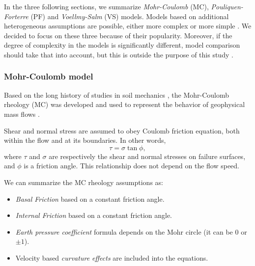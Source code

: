 \documentclass{article}
\begin{document}
In the three following sections, we summarize \emph{Mohr-Coulomb} (MC), \emph{Pouliquen-Forterre} (PF) and \emph{Voellmy-Salm} (VS) models. Models based on additional heterogeneous assumptions are possible, either more complex \citep{PitmanLe2005,Iverson2014} or more simple \citep{DadeHuppert1998}. We decided to focus on these three because of their popularity. Moreover, if the degree of complexity in the models is significantly different, model comparison should take that into account, but this is outside the purpose of this study \citep{Farrell2015}.

\subsubsection{Mohr-Coulomb model}\label{MCM}
Based on the long history of studies in soil mechanics \citep{Rankine1857,DruckerPage52}, the Mohr-Coulomb rheology (MC) was developed and used to represent the behavior of geophysical mass flows \citep{SavageHutter1989}.

Shear and normal stress are assumed to obey Coulomb friction equation, both within the flow and at its boundaries. In other words,
\begin{equation}
\tau = \sigma \tan \phi,
\end{equation}
where $\tau$ and $\sigma$ are respectively the shear and normal stresses on failure surfaces, and $\phi$ is a friction angle. This relationship does not depend on the flow speed.

We can summarize the MC rheology assumptions as:
\begin{itemize}
\item \textit{Basal Friction} based on a constant friction angle.

\item \textit{Internal Friction} based on a constant friction angle.

\item \textit{Earth pressure coefficient} formula depends on the Mohr circle (it can be $0$ or $\pm 1$).

\item Velocity based \textit{curvature effects} are included into the equations.
\end{itemize}

\end{document}
